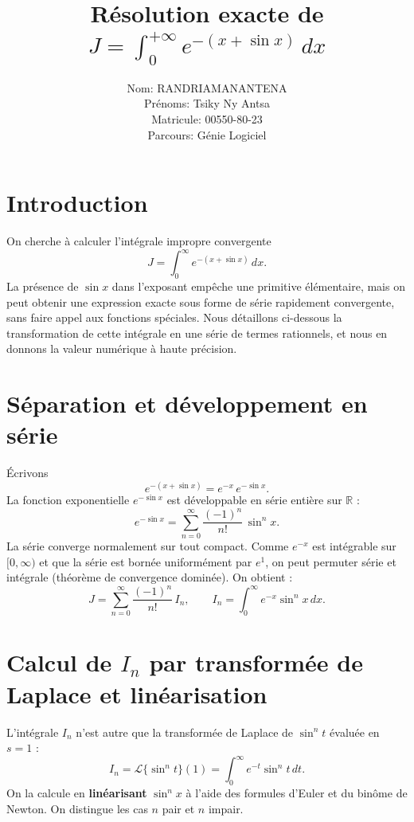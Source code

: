 \documentclass[a4paper,12pt]{article}
\title{Résolution exacte de \(\displaystyle J = \int_{0}^{+\infty} e^{-(x+\sin x)}\,dx\)}
\author{Nom: RANDRIAMANANTENA \\
Prénoms: Tsiky Ny Antsa \\
Matricule: 00550-80-23 \\
Parcours: Génie Logiciel}
\date{}
\begin{document}
\maketitle

\section{Introduction}
On cherche à calculer l'intégrale impropre convergente
\begin{equation}\label{eq:Jdef}
J = \int_{0}^{\infty} e^{-(x+\sin x)}\,dx.
\end{equation}
La présence de \(\sin x\) dans l'exposant empêche une primitive élémentaire, mais on peut obtenir une expression exacte sous forme de série rapidement convergente, sans faire appel aux fonctions spéciales. Nous détaillons ci-dessous la transformation de cette intégrale en une série de termes rationnels, et nous en donnons la valeur numérique à haute précision.

\section{Séparation et développement en série}
Écrivons
\[
e^{-(x+\sin x)} = e^{-x}\,e^{-\sin x}.
\]
La fonction exponentielle \(e^{-\sin x}\) est développable en série entière sur \(\mathbb{R}\) :
\[
e^{-\sin x} = \sum_{n=0}^{\infty} \frac{(-1)^n}{n!}\,\sin^n x.
\]
La série converge normalement sur tout compact. Comme \(e^{-x}\) est intégrable sur \([0,\infty)\) et que la série est bornée uniformément par \(e^{1}\), on peut permuter série et intégrale (théorème de convergence dominée). On obtient :
\begin{equation}\label{eq:Jserie}
J = \sum_{n=0}^{\infty} \frac{(-1)^n}{n!}\, I_n,
\qquad 
I_n = \int_{0}^{\infty} e^{-x} \sin^n x \, dx .
\end{equation}

\section{Calcul de \(I_n\) par transformée de Laplace et linéarisation}
L'intégrale \(I_n\) n'est autre que la transformée de Laplace de \(\sin^n t\) évaluée en \(s=1\) :
\[
I_n = \mathcal{L}\{\sin^n t\}(1) = \int_{0}^{\infty} e^{-t} \sin^n t \, dt .
\]
On la calcule en \textbf{linéarisant} \(\sin^n x\) à l'aide des formules d'Euler et du binôme de Newton. On distingue les cas \(n\) pair et \(n\) impair.
\end{document}
